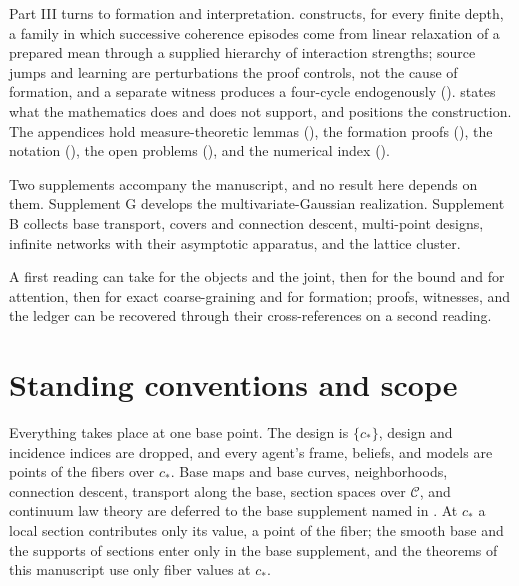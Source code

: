 Part III turns to formation and interpretation.  constructs, for every
finite depth, a family in which successive coherence episodes come from linear relaxation of a prepared mean
through a supplied hierarchy of interaction strengths; source jumps and learning are perturbations the proof
controls, not the cause of formation, and a separate witness produces a four-cycle endogenously
().  states what the mathematics does and does
not support, and  positions the construction. The appendices hold measure-theoretic
lemmas (), the formation proofs (), the
notation (), the open problems (), and the numerical index
().

Two supplements accompany the manuscript, and no result here depends on them. Supplement G develops the
multivariate-Gaussian realization. Supplement B collects base transport, covers and connection descent,
multi-point designs, infinite networks with their asymptotic apparatus, and the lattice cluster.

A first reading can take  for the objects and the joint, then
 for the bound and  for attention, then
 for exact coarse-graining and
 for formation; proofs, witnesses, and the ledger can be recovered through
their cross-references on a second reading.

\section{Standing conventions and scope}
\label{sec:intro-conventions}

Everything takes place at one base point. The design is $\{c_*\}$, design and incidence indices are dropped,
and every agent's frame, beliefs, and models are points of the fibers over $c_*$. Base maps and base curves,
neighborhoods, connection descent, transport along the base, section spaces over $\mathcal C$, and continuum
law theory are deferred to the base supplement named in . At $c_*$ a local
section contributes only its value, a point of the fiber; the smooth base and the supports of sections
enter only in the base supplement, and the theorems of this manuscript use only fiber values at $c_*$.


